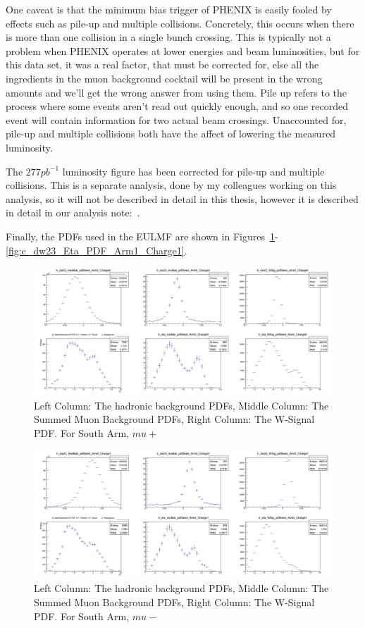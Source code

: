 One caveat is that the minimum bias trigger of PHENIX is easily fooled by
effects such as pile-up and multiple collisions. Concretely, this occurs when
there is more than one collision in a single bunch crossing. This is typically
not a problem when PHENIX operates at lower energies and beam luminosities, but
for this data set, it was a real factor, that must be corrected for, else all
the ingredients in the muon background cocktail will be present in the wrong
amounts and we'll get the wrong answer from using them. Pile up refers to the
process where some events aren't read out quickly enough, and so one recorded
event will contain information for two actual beam crossings. Unaccounted for,
pile-up and multiple collisions both have the affect of lowering the measured
luminosity. 

The $277 pb^{-1}$ luminosity figure has been corrected for pile-up and multiple
collisions. This is a separate analysis, done by my colleagues working on this
analysis, so it will not be described in detail in this thesis, however it is
described in detail in our analysis note:~\cite{Seidl2014a}.

Finally, the PDFs used in the EULMF are shown in
Figures~\ref{fig:c_dw23_Eta_PDF_Arm0_Charge0}-\ref{fig:c_dw23_Eta_PDF_Arm1_Charge1}.

\begin{figure}
  \centering
  \includegraphics[width=\linewidth]{././figures/c_dw23_Eta_PDF_Arm0_Charge0.png}
  \caption{
    Left Column: The hadronic background PDFs, Middle Column: The Summed Muon
    Background PDFs, Right Column: The W-Signal PDF. For South Arm, $mu+$
  }
  \label{fig:c_dw23_Eta_PDF_Arm0_Charge0}
\end{figure}

\begin{figure}
  \centering
  \includegraphics[width=\linewidth]{././figures/c_dw23_Eta_PDF_Arm0_Charge1.png}
  \caption{
    Left Column: The hadronic background PDFs, Middle Column: The Summed Muon
    Background PDFs, Right Column: The W-Signal PDF. For South Arm, $mu-$
  }
  \label{fig:c_dw23_Eta_PDF_Arm0_Charge1}
\end{figure}

